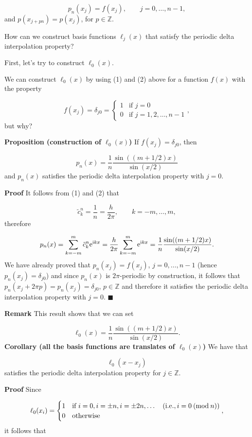 \documentclass[12pt,landscape]{article}
\begin{document}
{\[
p_n(x_{j}) = f(x_{j}), \qquad j = 0, \ldots, n - 1,
\]
and $p(x_{j + pn}) = p(x_{j})$, for $p \in \mathbb{Z}$.

How can we construct basis functions $\ell_{j}(x)$ that satisfy the periodic delta interpolation property?

First, let's try to construct $\ell_0(x)$.  

We can construct $\ell_0(x)$ by using (1) and (2) above for a function $f(x)$ with the property 

\[
f(x_j) = \delta_{j0} = \begin{cases}
1 & \text{if } j = 0 \\
0 & \text{if } j = 1, 2, \ldots, n - 1
\end{cases},
\]
but why?

\textbf{Proposition (construction of $\ell_0(x)$)} If $f(x_j) = \delta_{j0}$, then 

\[
p_n(x) = \frac{1}{n}\frac{\sin((m+1/2)x)}{\sin(x/2)}
\]
and $p_n(x)$ satisfies the periodic delta interpolation property with $j = 0$.

\textbf{Proof} It follows from (1) and (2) that

\[
\tilde{c}^n_{k} = \frac{1}{n} = \frac{h}{2\pi}, \qquad  k = -m, \ldots, m,
\]
therefore

\[
p_n(x) = \sum_{k=-m}^{m} \tilde{c}^n_k{\rm e}^{{\rm i}kx} = \frac{h}{2\pi}\sum_{k=-m}^{m} {\rm e}^{{\rm i}kx} = \frac{1}{n}\frac{\sin((m+1/2)x)}{\sin(x/2)}.
\]
We have already proved that $p_n(x_j) = f(x_j)$, $j = 0, \ldots, n-1$ (hence $p_n(x_j) = \delta_{j0}$) and since $p_n(x)$ is $2\pi$-periodic by construction, it follows that $p_n(x_j + 2\pi p) = p_n(x_j) = \delta_{j0}$, $p \in \mathbb{Z}$ and therefore it satisfies the periodic delta interpolation property with $j = 0$.    $\blacksquare$

\textbf{Remark} This result shows that we can set 

\[
\ell_0(x) = \frac{1}{n}\frac{\sin((m+1/2)x)}{\sin(x/2)}.
\]
\textbf{Corollary (all the basis functions are translates of $\ell_0(x)$)} We have that

\[
\ell_0(x - x_j)
\]
satisfies the periodic delta interpolation property for $j \in \mathbb{Z}$.

\textbf{Proof} Since

\[
\ell_{0}(x_i) = \begin{cases}
1 & \text{if } i = 0, i =  \pm n, i = \pm 2n, \ldots \quad (\text{i.e.}, i = 0\: ({\rm mod}\: n))  \\
0 & \text{otherwise } 
\end{cases},
\]
it follows that

}
\end{document}
